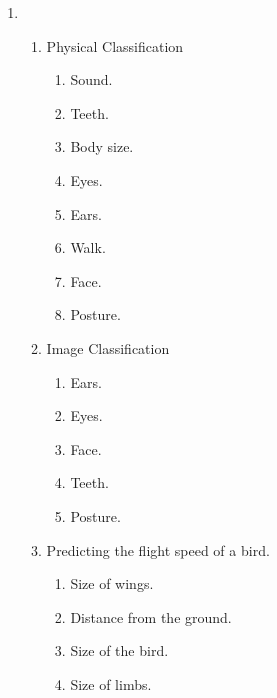 \documentclass[11pt]{article}
\begin{document}
\begin{enumerate}
	\item 
		\begin{enumerate}
			\item Physical Classification 
				\begin{enumerate}
					\item Sound.
					\item Teeth.
					\item Body size.
					\item Eyes.
					\item Ears.
					\item Walk.
					\item Face.
					\item Posture.
				\end{enumerate}
			\item Image Classification
				\begin{enumerate}
					\item Ears.
					\item Eyes.
					\item Face.
					\item Teeth.
					\item Posture.
				\end{enumerate}

			\item Predicting the flight speed of a bird.
				\begin{enumerate}
					\item Size of wings.
					\item Distance from the ground.
					\item Size of the bird.
					\item Size of limbs.
				\end{enumerate}
		\end{enumerate}
	\end{enumerate}
	
	
	
\end{document}
